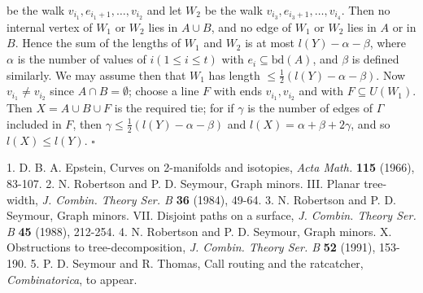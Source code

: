 \noindent be the walk $v_{i_1}, e_{i_1 + 1}, \dots, v_{i_2}$ and let $W_2$ be the walk $v_{i_3}, e_{i_3 + 1}, \dots, v_{i_4}$. Then no internal vertex of $W_1$ or $W_2$ lies in $A \cup B$, and no edge of $W_1$ or $W_2$ lies in $A$ or in $B$. Hence the sum of the lengths of $W_1$ and $W_2$ is at most $l(Y) - \alpha - \beta$, where $\alpha$ is the number of values of $i(1 \le i \le t)$ with $e_i \subseteq \text{bd}(A)$, and $\beta$ is defined similarly. We may assume then that $W_1$ has length $\le \frac{1}{2}(l(Y) - \alpha - \beta)$. Now $v_{i_1} \ne v_{i_2}$ since $A \cap B = \emptyset$; choose a line $F$ with ends $v_{i_1}, v_{i_2}$ and with $F \subseteq U(W_1)$. Then $X = A \cup B \cup F$ is the required tie; for if $\gamma$ is the number of edges of $\Gamma$ included in $F$, then $\gamma \le \frac{1}{2}(l(Y) - \alpha - \beta)$ and $l(X) = \alpha + \beta + 2\gamma$, and so $l(X) \le l(Y)$. $\square$


1. D. B. A. Epstein, Curves on 2-manifolds and isotopies, \textit{Acta Math.} \textbf{115} (1966), 83-107. 2. N. Robertson and P. D. Seymour, Graph minors. III. Planar tree-width, \textit{J. Combin. Theory Ser. B} \textbf{36} (1984), 49-64. 3. N. Robertson and P. D. Seymour, Graph minors. VII. Disjoint paths on a surface, \textit{J. Combin. Theory Ser. B} \textbf{45} (1988), 212-254. 4. N. Robertson and P. D. Seymour, Graph minors. X. Obstructions to tree-decomposition, \textit{J. Combin. Theory Ser. B} \textbf{52} (1991), 153-190. 5. P. D. Seymour and R. Thomas, Call routing and the ratcatcher, \textit{Combinatorica}, to appear.
